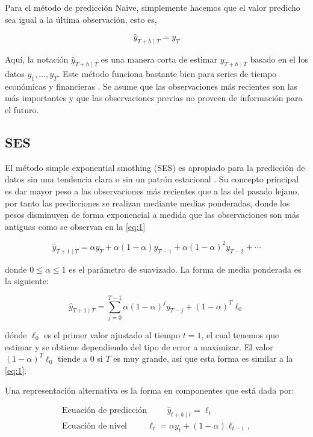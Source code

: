 Para el método de predicción Naive, simplemente hacemos que el valor predicho sea igual a la última observación, esto es,

\[ \hat{y}_{T+h \mid T}=y_{T} \]

Aquí, la notación $\hat{y}_{T+h \mid T}$ es una manera corta de estimar $y_{T+h \mid T}$ basado en el los datos $y_{1}, \ldots, y_{T}$. Este método funciona bastante bien para series de tiempo económicas y financieras \cite{hyndmanForecastingPrinciplesPractice}.
Se asume que las observaciones más recientes son las más importantes y que las observaciones previas no proveen de información para el futuro.

\subsection{SES}
El método simple exponential smothing (SES) es apropiado para la predicción de datos sin una tendencia clara o sin un patrón estacional \cite{hyndmanForecastingPrinciplesPractice}. Su concepto principal es dar mayor peso a las observaciones más recientes que a las del pasado lejano, por tanto las predicciones se realizan mediante medias ponderadas, donde los pesos disminuyen de forma exponencial a medida que las observaciones son más antiguas como se observan en la \autoref{eq:1}

\begin{equation}
	\hat{y}_{T+1 \mid T}=\alpha y_{T}+\alpha(1-\alpha) y_{T-1}+\alpha(1-\alpha)^{2} y_{T-2}+\cdots
	\label{eq:1}
\end{equation}

donde $0 \leq \alpha \leq 1$ es el parámetro de suavizado. La forma de media ponderada es la siguiente:

\[\hat{y}_{T+1 \mid T}=\sum_{j=0}^{T-1} \alpha(1-\alpha)^{j} y_{T-j}+(1-\alpha)^{T} \ell_{0}\]

dónde $\ell_{0}$ es el primer valor ajustado al tiempo $t=1$, el cual tenemos que estimar y se obtiene dependiendo del tipo de error a maximizar. El valor $(1-\alpha)^{T} \ell_{0}$ tiende a $0$ si $T$ es muy grande, así que esta forma es similar a la \autoref{eq:1}. 

Una representación alternativa es la forma en componentes que está dada por:

\begin{equation*}
	\begin{array}{lcl} 
		\textrm{Ecuación de predicción} \hspace{1cm} \hat{y}_{t+h \mid t}=\ell_{t}\\
		\textrm{Ecuación de nivel}\hspace{1cm} \ell_{t}=\alpha y_{t}+(1-\alpha) \ell_{t-1},
	\end{array} 
\end{equation*}

